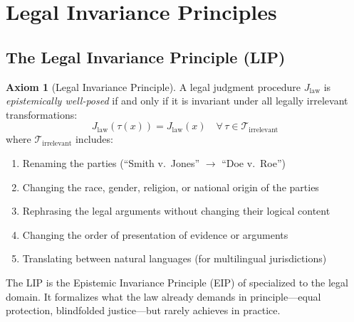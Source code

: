 \documentclass[12pt]{article}
\theoremstyle{definition}
\newtheorem{axiom}{Axiom}
\theoremstyle{remark}
\begin{document}
\section{Legal Invariance Principles}
\label{sec:invariance}

\subsection{The Legal Invariance Principle (LIP)}

\begin{axiom}[Legal Invariance Principle]
\label{axiom:lip}
A legal judgment procedure $J_{\text{law}}$ is \emph{epistemically well-posed} if and only if it is invariant under all legally irrelevant transformations:
\begin{equation}
J_{\text{law}}(\tau(x)) = J_{\text{law}}(x) \quad \forall\, \tau \in \mathcal{T}_{\text{irrelevant}}
\label{eq:lip}
\end{equation}
where $\mathcal{T}_{\text{irrelevant}}$ includes:
\begin{enumerate}
    \item Renaming the parties (``Smith v.\ Jones'' $\to$ ``Doe v.\ Roe'')
    \item Changing the race, gender, religion, or national origin of the parties
    \item Rephrasing the legal arguments without changing their logical content
    \item Changing the order of presentation of evidence or arguments
    \item Translating between natural languages (for multilingual jurisdictions)
\end{enumerate}
\end{axiom}

The LIP is the Epistemic Invariance Principle (EIP) of \cite{anon2025c} specialized to the legal domain.  It formalizes what the law already demands in principle---equal protection, blindfolded justice---but rarely achieves in practice.
\end{document}
